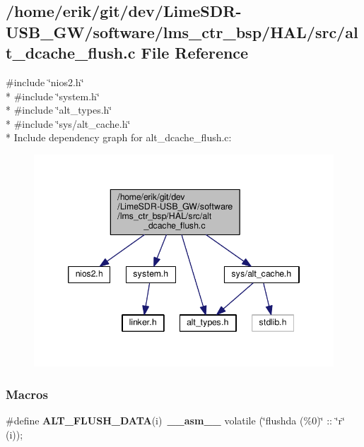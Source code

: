 \subsection{/home/erik/git/dev/\+Lime\+S\+D\+R-\/\+U\+S\+B\+\_\+\+G\+W/software/lms\+\_\+ctr\+\_\+bsp/\+H\+A\+L/src/alt\+\_\+dcache\+\_\+flush.c File Reference}
\label{alt__dcache__flush_8c}
{\ttfamily \#include \char`\"{}nios2.\+h\char`\"{}}\\*
{\ttfamily \#include \char`\"{}system.\+h\char`\"{}}\\*
{\ttfamily \#include \char`\"{}alt\+\_\+types.\+h\char`\"{}}\\*
{\ttfamily \#include \char`\"{}sys/alt\+\_\+cache.\+h\char`\"{}}\\*
Include dependency graph for alt\+\_\+dcache\+\_\+flush.\+c\+:
\nopagebreak
\begin{figure}[H]
\begin{center}
\leavevmode
\includegraphics[width=346pt]{d7/d0b/alt__dcache__flush_8c__incl}
\end{center}
\end{figure}
\subsubsection*{Macros}
\begin{DoxyCompactItemize}
\item 
\#define {\bf A\+L\+T\+\_\+\+F\+L\+U\+S\+H\+\_\+\+D\+A\+TA}(i)~{\bf \+\_\+\+\_\+asm\+\_\+\+\_\+} volatile (\char`\"{}flushda (\%0)\char`\"{} \+:: \char`\"{}r\char`\"{} (i));
\end{DoxyCompactItemize}

